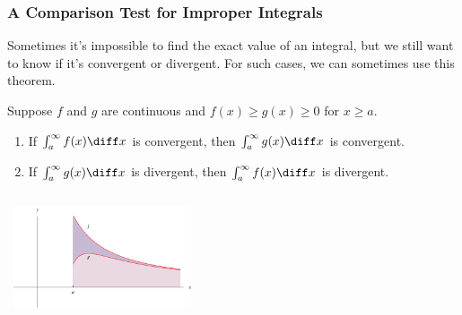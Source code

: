 \begin{frame}
\frametitle{A Comparison Test for Improper Integrals}
Sometimes it's impossible to find the exact value of an integral, but we still want to know if it's convergent or divergent.  For such cases, we can sometimes use this theorem.
\begin{theorem}
Suppose $f$ and $g$ are continuous and $f(x) \geq g(x) \geq 0$ for $x \geq a$.
\begin{enumerate}
\item  If $\int_a^\infty f(x) \diff x$ is convergent, then $\int_a^\infty g(x)\diff x$ is convergent.
\item  If $\int_a^\infty g(x) \diff x$ is divergent, then $\int_a^\infty f(x)\diff x$ is divergent.
\end{enumerate}
\end{theorem}
\begin{columns}[c]
\ \includegraphics[height=3cm]{improper-integrals/pictures/08-08-comptest.pdf}%
%
\end{columns}
\end{frame}
